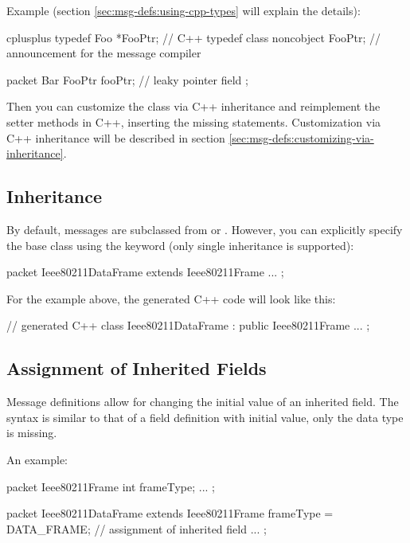 Example (section \ref{sec:msg-defs:using-cpp-types} will explain the
details):

\begin{msg}
cplusplus {{ typedef Foo *FooPtr; }} // C++ typedef
class noncobject FooPtr; // announcement for the message compiler

packet Bar
{
    FooPtr fooPtr;  // leaky pointer field
};
\end{msg}

Then you can customize the class via C++ inheritance and reimplement
the setter methods in C++, inserting the missing  statements.
Customization via C++ inheritance will be described in section
\ref{sec:msg-defs:customizing-via-inheritance}.


\subsection{Inheritance}
\label{sec:msg-defs:inheritance}

By default, messages are subclassed from  or
. However, you can explicitly specify the base class using
the  keyword (only single inheritance is supported):

\begin{msg}
packet Ieee80211DataFrame extends Ieee80211Frame
{
    ...
};
\end{msg}

For the example above, the generated C++ code will look like this:

\begin{cpp}
// generated C++
class Ieee80211DataFrame : public Ieee80211Frame {
    ...
};
\end{cpp}


\subsection{Assignment of Inherited Fields}
\label{sec:msg-defs:assignment-of-inherited-fields}

Message definitions allow for changing the initial value of an inherited
field. The syntax is similar to that of a field definition with initial
value, only the data type is missing.

An example:

\begin{msg}
packet Ieee80211Frame
{
    int frameType;
    ...
};

packet Ieee80211DataFrame extends Ieee80211Frame
{
    frameType = DATA_FRAME;  // assignment of inherited field
    ...
};
\end{msg}

